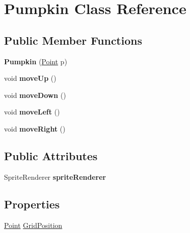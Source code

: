 \hypertarget{class_pumpkin}{}\section{Pumpkin Class Reference}
\label{class_pumpkin}
\subsection*{Public Member Functions}
\begin{DoxyCompactItemize}
\item 
\mbox{\label{class_pumpkin_ad48994bb743f7547b17516a3599808da}} 
{\bfseries Pumpkin} (\hyperlink{struct_point}{Point} p)
\item 
\mbox{\label{class_pumpkin_aef1982c1ef62d3f74fcc345a03a7f54f}} 
void {\bfseries move\+Up} ()
\item 
\mbox{\label{class_pumpkin_a3afb056b649203f4c49171f598d1711a}} 
void {\bfseries move\+Down} ()
\item 
\mbox{\label{class_pumpkin_ab8228ef139ace9c450d4d936e5e2a500}} 
void {\bfseries move\+Left} ()
\item 
\mbox{\label{class_pumpkin_abc72185ad960e4c54658b7826faf79ce}} 
void {\bfseries move\+Right} ()
\end{DoxyCompactItemize}
\subsection*{Public Attributes}
\begin{DoxyCompactItemize}
\item 
\mbox{\label{class_pumpkin_aa2ab337ccbb0855810684bdc68d55146}} 
Sprite\+Renderer {\bfseries sprite\+Renderer}
\end{DoxyCompactItemize}
\subsection*{Properties}
\begin{DoxyCompactItemize}
\item 
\hyperlink{struct_point}{Point} \hyperlink{class_pumpkin_aa958881a119da828858daf9e3bc069de}{Grid\+Position}
\end{DoxyCompactItemize}


